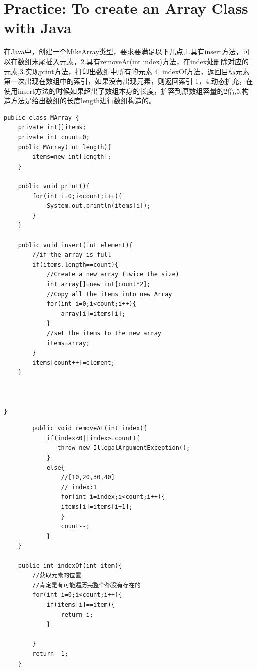 \documentclass[
	11pt,
	fleqn,
	a4paper,
]{LegrandOrangeBook}
\begin{document}
\section{Practice: To create an Array Class with Java}

\begin{example}
	在Java中，创建一个MikeArray类型，要求要满足以下几点,1.具有insert方法，可以在数组末尾插入元素，2.具有removeAt(int index)方法，在index处删除对应的元素,3.实现print方法，打印出数组中所有的元素 4. indexOf方法，返回目标元素第一次出现在数组中的索引，如果没有出现元素，则返回索引-1，4.动态扩充，在使用insert方法的时候如果超出了数组本身的长度，扩容到原数组容量的2倍,5.构造方法是给出数组的长度length进行数组构造的。
\end{example}
\begin{verbatim}
public class MArray {
    private int[]items;
    private int count=0;
    public MArray(int length){
        items=new int[length];
    }

    public void print(){
        for(int i=0;i<count;i++){
            System.out.println(items[i]);
        }
    }

    public void insert(int element){
        //if the array is full
        if(items.length==count){
            //Create a new array (twice the size)
            int array[]=new int[count*2];
            //Copy all the items into new Array
            for(int i=0;i<count;i++){
                array[i]=items[i];
            }
            //set the items to the new array
            items=array;
        }
        items[count++]=element;
    }



}

\end{verbatim}

\begin{verbatim}
	    public void removeAt(int index){
            if(index<0||index>=count){
               throw new IllegalArgumentException();
            }
            else{
                //[10,20,30,40]
                // index:1
                for(int i=index;i<count;i++){
                items[i]=items[i+1];
                }
                count--;
            }
    }

    public int indexOf(int item){
        //获取元素的位置
        //肯定是有可能遍历完整个都没有存在的
        for(int i=0;i<count;i++){
            if(items[i]==item){
                return i;
            }

        }
        return -1;
    }
\end{verbatim}
\end{document}
